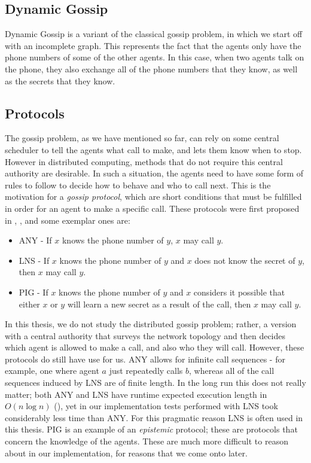 \documentclass[ %
                    author={Leo Poulson},
                supervisor={Dr. Steven Ramsay},
                    degree={BSc},
                     title={Epistemic Planning for the Dynamic Gossip problem},
                  subtitle={},
                      year={2019} ]{dissertation}
\begin{document}
\subsection{Dynamic Gossip}

Dynamic Gossip is a variant of the classical gossip problem, in which we start
off with an incomplete graph. This represents the fact that the agents only have
the phone numbers of some of the other agents. In this case, when two agents
talk on the phone, they also exchange all of the phone numbers that they know,
as well as the secrets that they know. 

\subsection{Protocols}
\label{sec:Protocols}

The gossip problem, as we have mentioned so far, can rely on some central
scheduler to tell the agents what call to make, and lets them know when to stop.
However in distributed computing, methods that do not require this central
authority are desirable. In such a situation, the agents need to have some form
of rules to follow to decide how to behave and who to call next. This is the
motivation for a \emph{gossip protocol}, which are short conditions that must
be fulfilled in order for an agent to make a specific call. These protocols were
first proposed in \cite{EPfDG}, \cite{KnowledgeandGossip}, and some exemplar
ones are:

\begin{itemize}
\item \textsf{ANY} - If $x$ knows the phone number of $y$, $x$ may call $y$.
\item \textsf{LNS} - If $x$ knows the phone number of $y$ and $x$ does not
    know the secret of $y$, then $x$ may call $y$.
  \item \textsf{PIG} - If $x$ knows the phone number of $y$ and $x$ considers it
    possible that either $x$ or $y$ will learn a new secret as a result of the
    call, then $x$ may call $y$.
\end{itemize}

In this thesis, we do not study the distributed gossip problem; rather, a
version with a central authority that surveys the network topology and then
decides which agent is allowed to make a call, and also who they will call.
However, these protocols do still have use for us. \textsf{ANY} allows for
infinite call sequences - for example, one where agent $a$ just repeatedly calls
$b$, whereas all of the call sequences induced by \textsf{LNS} are of finite
length. In the long run this does not really matter; both \textsf{ANY} and
\textsf{LNS} have runtime expected execution length in $O(n \log n)$
(\cite{DynamicGossip}), yet in our implementation tests performed with
\textsf{LNS} took considerably less time than \textsf{ANY}. For this pragmatic
reason \textsf{LNS} is often used in this thesis. \textsf{PIG} is an example of
an \emph{epistemic} protocol; these are protocols that concern the knowledge of
the agents. These are much more difficult to reason about in our implementation,
for reasons that we come onto later.
\end{document}
